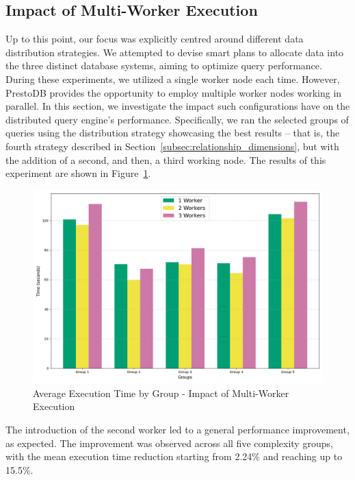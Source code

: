 \documentclass[conference]{IEEEtran}
\begin{document}
\subsection{Impact of Multi-Worker Execution}

Up to this point, our focus was explicitly centred around different data distribution strategies. We attempted to devise smart plans to allocate data into the three distinct database systems, aiming to optimize query performance. During these experiments, we utilized a single worker node each time. However, PrestoDB provides the opportunity to employ multiple worker nodes working in parallel. In this section, we investigate the impact such configurations have on the distributed query engine’s performance. Specifically, we ran the selected groups of queries using the distribution strategy showcasing the best results – that is, the fourth strategy described in Section~\ref{subsec:relationship_dimensions}, but with the addition of a second, and then, a third working node.
The results of this experiment are shown in Figure~\ref{fig:multiple_workers}.


\begin{figure}[htbp]
    \centering
    \includegraphics[width=\linewidth]{figures/multiple_workers.png}
    \caption{Average Execution Time by Group - Impact of Multi-Worker Execution}
    \label{fig:multiple_workers}
\end{figure}

The introduction of the second worker led to a general performance improvement, as expected. The improvement was observed across all five complexity groups, with the mean execution time reduction starting from 2.24\% and reaching up to 15.5\%.
\end{document}
